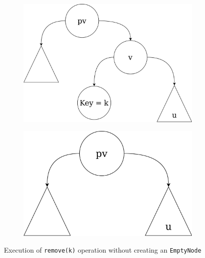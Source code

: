 \documentclass[times, dvipsnames,%
               languages={russian,english} %
              ]{itmo-student-thesis}
\begin{document}
\begin{figure}[H]
     \centering
     \begin{subfigure}[b]{0.45\linewidth}
          \centering
          \includegraphics[width=\linewidth]{pics/remove-no-empty-1.png}
          \label{remove-no-empty-1-pic}
     \end{subfigure}
     \hfill
     \begin{subfigure}[b]{0.45\linewidth}
          \centering
          \includegraphics[width=\linewidth]{pics/remove-no-empty-2.png}
          \label{remove-no-empty-2-pic}
     \end{subfigure}
    \caption{Execution of \texttt{remove(k)} operation without creating an \texttt{EmptyNode}}
    \label{remove-no-empty-pics}
\end{figure}
\end{document}

